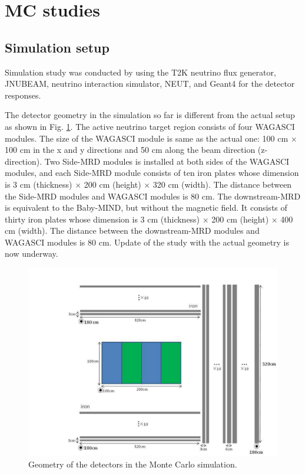 \section{MC studies}
\label{sec:mc_study}
\subsection{Simulation setup}

Simulation study was conducted by using the T2K neutrino flux generator, JNUBEAM, neutrino interaction simulator, NEUT, and Geant4 for the detector responses.

The detector geometry in the simulation so far is different from the actual setup as shown in Fig. \ref{fig:wagasci_mc_geometry}.
The active neutrino target region consists of four WAGASCI modules.
The size of the WAGASCI module is same as the actual one: 100 cm $\times$ 100 cm in the x and y directions and 50 cm along the beam direction (z-direction).
Two Side-MRD modules is installed at both sides of the WAGASCI modules, and each Side-MRD module consists of ten iron plates whose dimension is 3 cm (thickness) $\times$ 200 cm (height) $\times$ 320 cm (width). 
The distance between the Side-MRD modules and WAGASCI modules is 80 cm.
The downstream-MRD is equivalent to the Baby-MIND, but without the magnetic field.
It consists of thirty iron plates whose dimension is  3 cm (thickness) $\times$ 200 cm (height) $\times$ 400 cm (width).
The distance between the downstream-MRD modules and WAGASCI modules is 80 cm.
Update of the study with the actual geometry is now underway.

\begin{figure}[tbhp]
\begin{center}
\includegraphics[width=0.8\linewidth]{fig/wagasci_mc_geometry.pdf}
\end{center}
\caption{
Geometry of the detectors in the Monte Carlo simulation.}
\label{fig:wagasci_mc_geometry}
\end{figure}

